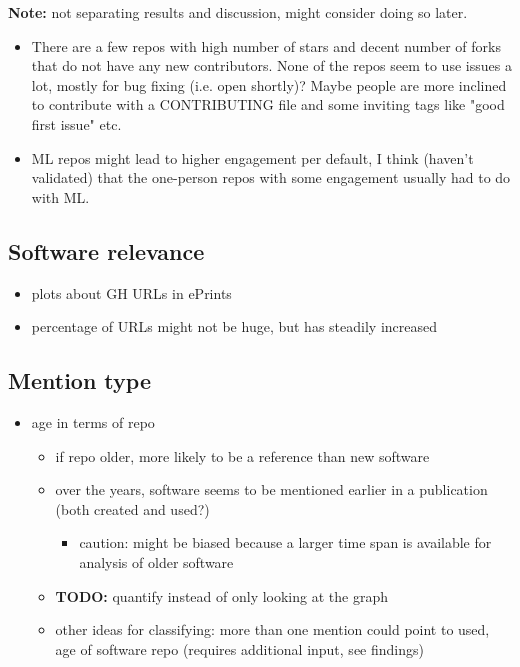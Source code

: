 \documentclass[10pt,a4paper]{scrartcl}
\begin{document}
\textbf{Note:} not separating results and discussion, might consider doing so later.

\begin{itemize}
    \item There are a few repos with high number of stars and decent number of forks that do not have any new contributors. None of the repos seem to use issues a lot, mostly for bug fixing (i.e. open shortly)? Maybe people are more inclined to contribute with a CONTRIBUTING file and some inviting tags like "good first issue" etc.
    \item ML repos might lead to higher engagement per default, I think (haven't validated) that the one-person repos with some engagement usually had to do with ML.
\end{itemize}

\subsection*{Software relevance}

\begin{itemize}
    \item plots about GH URLs in ePrints
    \item percentage of URLs might not be huge, but has steadily increased
\end{itemize}

\subsection*{Mention type}

\begin{itemize}
    \item age in terms of repo
    \begin{itemize}
        \item if repo older, more likely to be a reference than new software
        \item over the years, software seems to be mentioned earlier in a publication (both created and used?)
        \begin{itemize}
            \item caution: might be biased because a larger time span is available for analysis of older software
        \end{itemize}
        \item \textbf{TODO: }quantify instead of only looking at the graph
        \item other ideas for classifying: more than one mention could point to used, age of software repo (requires additional input, see findings)
    \end{itemize}
\end{itemize}
\end{document}
